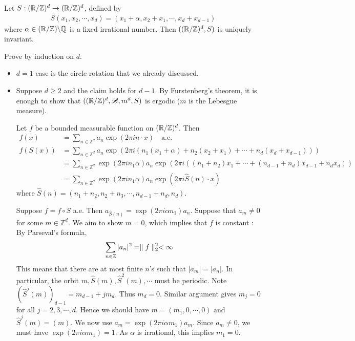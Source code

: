\documentclass[10pt,a4paper]{report}
\newenvironment{proof}
{\begin{changemargin}{1cm}{0.5cm} 
	}%
	{\end{changemargin}
}
\begin{document}
\cor Let $S : (\mathbb{R}/ \mathbb{Z})^d \rightarrow (\mathbb{R}/ \mathbb{Z})^d$, defined by
\begin{align*}
S(x_1,x_2, \cdots, x_d)  = (x_1 +\alpha,x_2+x_1, \cdots, x_d+x_{d-1})
\end{align*}
where $\alpha \in (\mathbb{R}/ \mathbb{Z}) \backslash \mathbb{Q}$ is a fixed irrational number. Then $((\mathbb{R}/\mathbb{Z})^d,S)$ is uniquely invariant. 
\begin{proof}
\pf Prove by induction on $d$.
\begin{itemize}
\item $d=1$ case is the circle rotation that we already discussed.
\item Suppose $d\geq 2$ and the claim holds for $d-1$. By Furstenberg's theorem, it is enough to show that $((\mathbb{R}/\mathbb{Z})^d, \mathscr{B}, m^d,S)$ is ergodic ($m$ is the Lebesgue measure).

\quad Let $f$ be a bounded measurable function on $(\mathbb{R}/\mathbb{Z})^d$. Then
\begin{align*}
f(x) &= \sum_{n\in \mathbb{Z}^d} a_n \exp(2\pi i n \cdot x) \quad \text{a.e.}\\ 
f(S(x)) &= \sum_{n\in \mathbb{Z}^d}  a_n \exp(2\pi i( n_1(x_1 +\alpha) + n_2(x_2+x_1) + \cdots + n_d(x_d +x_{d-1})    )) \\
&= \sum_{n\in \mathbb{Z}^d} \exp(2\pi i n_1 \alpha) a_n \exp(2\pi i((n_1 + n_2)x_1 + \cdots +(n_{d-1}+n_d)x_{d-1} + n_d x_d  )  ) \\
&= \sum_{n\in \mathbb{Z}^d} \exp(2\pi i n_1 \alpha) a_n \exp(2\pi i \hat{S}(n) \cdot x)
\end{align*}
where $\hat{S}(n) = (n_1 + n_2, n_2 + n_3, \cdots, n_{d-1}+n_d, n_d)$.

\quad Suppose $f = f\circ S$ a.e. Then $a_{\hat{S}(n)} = \exp(2\pi i\alpha n_1) a_n$. Suppose that $a_m \neq 0$ for some $m\in \mathbb{Z}^d$. We aim to show $m=0$, which implies that $f$ is constant : By Parseval's formula,
\begin{align*}
\sum_{n\in \mathbb{Z}}|a_n|^2  = \parallel f \parallel_{2}^2 < \infty
\end{align*}
This means that there are at most finite $n$'s such that $|a_m| = |a_n|$. In particular, the orbit $m,\hat{S}(m),\hat{S}^2(m),\cdots$ must be periodic. Note $(\hat{S}^j(m))_{d-1} = m_{d-1} + jm_d$. Thus $m_d =0$. Similar argument gives $m_j=0$ for all $j=2,3,\cdots,d$. Hence we should have $m=(m_1,0,\cdots,0)$ and $\hat{S}^j(m) = (m)$. We now use $a_m = \exp(2\pi i \alpha m_1) a_m$. Since $a_m \neq 0$, we must have $\exp(2\pi i\alpha m_1) =1$. As $\alpha$ is irrational, this implies $m_1 =0$. 
\end{itemize}

\eop
\end{proof}
\s
\end{document}
